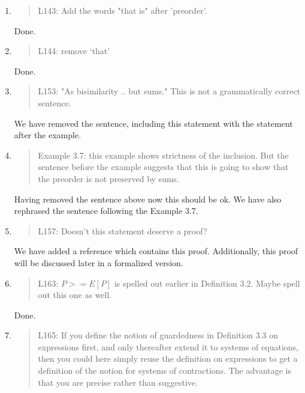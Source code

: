 \begin{enumerate}
\item \begin{quote}
    L143: Add the words "that is" after 'preorder'.
  \end{quote}
  Done.
  
\item \begin{quote}
    L144: remove ‘that’
  \end{quote}
  Done.
  
\item \begin{quote}
    L153: "As bisimilarity .. but sums." This is not a grammatically correct sentence.
  \end{quote}

  We have removed the sentence, including this statement with the
  statement after the example.
  
\item \begin{quote}
    Example 3.7: this example shows strictness of the inclusion. But
    the sentence before the example suggests that this is going to
    show that the preorder is not preserved by sums.
  \end{quote}

  Having removed the sentence above now this should be ok. We have
  also rephrased the sentence following the Example 3.7.
  
\item \begin{quote}
    L157: Doesn’t this statement deserve a proof?
  \end{quote}
  We have added a reference which contains this proof. Additionally,
  this proof will be discussed later in a formalized version.
  
\item \begin{quote}
    L163: $P >= E[P]$ is spelled out earlier in Definition 3.2. Maybe spell out this one as well.
  \end{quote}

  Done.

\item \begin{quote}
    L165: If you define the notion of guardedness in Definition 3.3 on
    expressions first, and only thereafter extend it to systems of
    equations, then you could here simply reuse the definition on
    expressions to get a definition of the notion for systems of
    contractions. The advantage is that you are precise rather than
    suggestive.
  \end{quote}


\end{enumerate}

